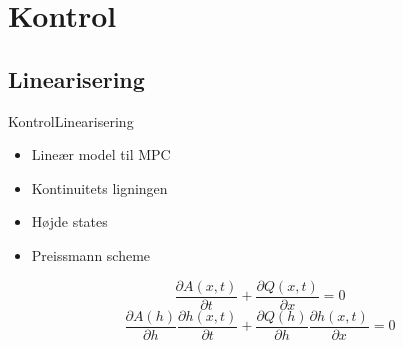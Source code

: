 \section{Kontrol}
\subsection{Linearisering}
\begin{frame}{Kontrol}{Linearisering}
 \vfill\vfill\centering    
\begin{itemize}
	\item Lineær model til MPC\vspace{5mm}
	\item Kontinuitets ligningen \vspace{5mm}
	\item Højde states \vspace{5mm}
	\item Preissmann scheme \vspace{5mm}
\end{itemize}
\begin{equation*}\label{eq:linearization_Continuity}
\frac{\partial A(x,t)}{\partial t} + \frac{\partial Q(x,t)}{\partial x}=0
\end{equation*}\vspace{5mm}
\begin{equation*}
	\frac{\partial A(h)}{\partial h}\frac{\partial h(x,t)}{\partial t} + \frac{\partial Q(h)}{\partial h}\frac{\partial h(x,t)}{\partial x}=0
\end{equation*}
\vfill\vfill
\end{frame}

